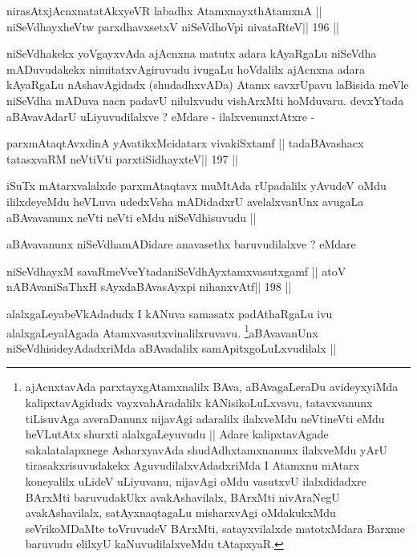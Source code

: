 \begin{shl}
nirasAtxjAcnxnatatAkxyeVR labadhx AtamxnayxthA\s\s tamxnA ||
niSeVdhayxheVtw parxdhavxsetxV niSeVdhoV\s pi nivataRteV\hfill || 196 ||
\end{shl}

\begin{artha}
niSeVdhakekx yoVgayxvAda ajAcnxna matutx adara kAyaRgaLu niSeVdha
mADuvudakekx nimitatxvAgiruvudu ivugaLu hoVdalilx ajAcnxna adara
kAyaRgaLu nAshavAgidadx (shudadhxvADa) Atamx savxrUpavu laBisida meVle
niSeVdha mADuva nacn padavU nilulxvudu vishArxMti hoMduvaru. devxYtada
aBAvavAdarU uLiyuvudilalxve ? eMdare - ilalxvenunxtAtxre -
\end{artha}

\begin{shl}
parxmAtaqtAvxdinA yAvatikxMcidatarx vivakiSxtamf ||
tadaBAvashacx tatasxvaRM neVtiVti parxtiSidhayxteV\hfill || 197 ||
\end{shl}

\begin{artha}
iSuTx mAtarxvalalxde parxmAtaqtavx muMtAda rUpadalilx yAvudeV oMdu
ililxdeyeMdu heVLuva udedxVsha mADidadxrU avelalxvanUnx avugaLa
aBAvavanunx neVti neVti eMdu niSeVdhisuvudu ||

aBAvavanunx niSeVdhamADidare anavasethx baruvudilalxve ? eMdare
\end{artha}

\begin{shl}
niSeVdhayxM savaRmeVveYtadaniSeVdhAyxtamxvasutxgamf ||
atoV nABAvaniSaThxH sAyxdaBAvasAyxpi nihanxvAtf\hfill || 198 ||
\end{shl}

\begin{artha}
alalxgaLeyabeVkAdadudx I kANuva samasatx padAthaRgaLu ivu
alalxgaLeyalAgada
Atamxvasutxvinalilxruvavu. \footnote[1]{ajAcnxtavAda
  parxtayxgAtamxnalilx BAva, aBAvagaLeraDu avideyxyiMda
  kalipxtavAgidudx vayxvahAradalilx kANisikoLuLxvavu, tatavxvanunx
  tiLisuvAga averaDanunx nijavAgi adaralilx ilalxveMdu neVtineVti eMdu
heVLutAtx shurxti alalxgaLeyuvudu || Adare kalipxtavAgade
sakalatalapxnege AsharxyavAda shudAdhxtamxnanunx ilalxveMdu yArU
tirasakxrisuvudakekx AguvudilalxvAdadxriMda I Atamxnu mAtarx
koneyalilx uLideV uLiyuvanu, nijavAgi oMdu vasutxvU ilalxdidadxre
BArxMti baruvudakUkx avakAshavilalx, BArxMti nivAraNegU
avakAshavilalx, satAyxnaqtagaLu misharxvAgi oMdakukxMdu seVrikoMDaMte
toVruvudeV BArxMti, satayxvilalxde matotxMdara Barxme baruvudu elilxyU
kaNuvudilalxveMdu tAtapxyaR.}aBAvavanUnx niSeVdhisideyAdadxriMda aBAvadalilx samApitxgoLuLxvudilalx ||
\end{artha}

